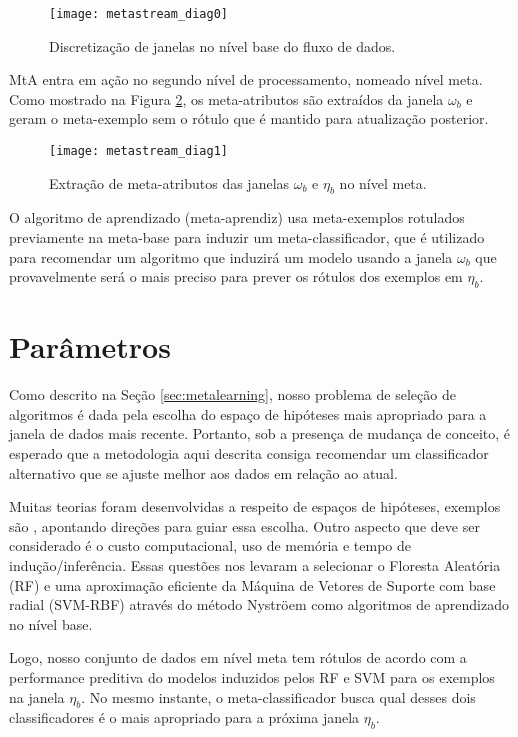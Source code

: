 \begin{figure}[ht]
    \centering
    \texttt{[image: metastream\_diag0]}
    \caption{Discretização de janelas no nível base do fluxo de dados.}
    \label{fig:ms_diagram0}
\end{figure}

MtA entra em ação no segundo nível de processamento, nomeado nível meta. Como
mostrado na Figura \ref{fig:ms_diagram1}, os meta-atributos são extraídos da
janela $\omega_b$ e geram o meta-exemplo sem o rótulo que é mantido para
atualização posterior.

\begin{figure}[ht]
    \centering
    \texttt{[image: metastream\_diag1]}
    \caption{Extração de meta-atributos das janelas  $\omega_b$ e $\eta_b$ no nível meta.}
    \label{fig:ms_diagram1}
\end{figure}

O algoritmo de aprendizado (meta-aprendiz) usa meta-exemplos rotulados
previamente na meta-base para induzir um meta-classificador, que é utilizado
para recomendar um algoritmo que induzirá um modelo usando a janela $\omega_b$
que provavelmente será o mais preciso para prever os rótulos dos exemplos em
$\eta_b$.

\section{Parâmetros}
\label{sec:params}

Como descrito na Seção \ref{sec:metalearning}, nosso problema de seleção de algoritmos é dada pela escolha do espaço de hipóteses mais apropriado para a janela de dados mais recente. Portanto, sob a presença de mudança de conceito, é esperado que a metodologia aqui descrita consiga recomendar um classificador alternativo que se ajuste melhor aos dados em relação ao atual.

Muitas teorias foram desenvolvidas a respeito de espaços de hipóteses, exemplos são \cite{vapnik2013nature, valiant1984theory}, apontando direções para guiar essa escolha. Outro aspecto que deve ser considerado é o custo computacional, uso de memória e tempo de indução/inferência. Essas questões nos levaram a selecionar o Floresta Aleatória (RF) \cite{Breiman2001} e uma aproximação eficiente da Máquina de Vetores de Suporte com base radial (SVM-RBF) através do método Nystr\"oem \cite{williams2001using} como algoritmos de aprendizado no nível base.

Logo, nosso conjunto de dados em nível meta tem rótulos de acordo com a performance preditiva do modelos induzidos pelos RF e SVM para os exemplos na janela $\eta_b$. No mesmo instante, o meta-classificador busca qual desses dois classificadores é o mais apropriado para a próxima janela $\eta_b$.

